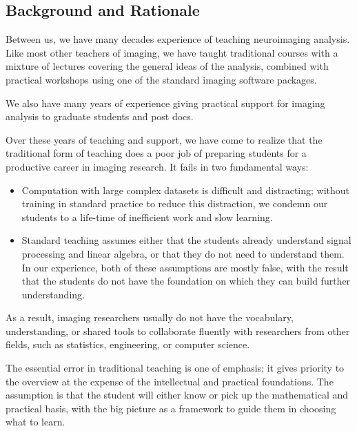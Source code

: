 \subsection{Background and Rationale}\label{background}

Between us, we have many decades experience of teaching neuroimaging analysis.
Like most other teachers of imaging, we have taught traditional courses with a
mixture of lectures covering the general ideas of the analysis, combined with
practical workshops using one of the standard imaging software packages.

We also have many years of experience giving practical support for imaging
analysis to graduate students and post docs.

Over these years of teaching and support, we have come to realize
that the traditional form of teaching does a poor job of preparing
students for a productive career in imaging research.  It fails in two
fundamental ways:

\begin{itemize}

\item
    Computation with large complex datasets is difficult and distracting;
        without training in standard practice to reduce this distraction, we
        condemn our students to a life-time of inefficient work and slow
        learning.

\item
    Standard teaching assumes either that the students already understand
        signal processing and linear algebra, or that they do not need to
        understand them.  In our experience, both of these assumptions are
        mostly false, with the result that the students do not have the
        foundation on which they can build further understanding.

\end{itemize}

As a result, imaging researchers usually do not have the vocabulary,
understanding, or shared tools to collaborate fluently with researchers from
other fields, such as statistics, engineering, or computer science.

The essential error in traditional teaching is one of emphasis;
it gives priority to the overview at the expense of the
intellectual and practical foundations.  The assumption is
that the student will either know or pick up the mathematical and
practical basis, with the big picture as a framework to guide them in
choosing what to learn.


